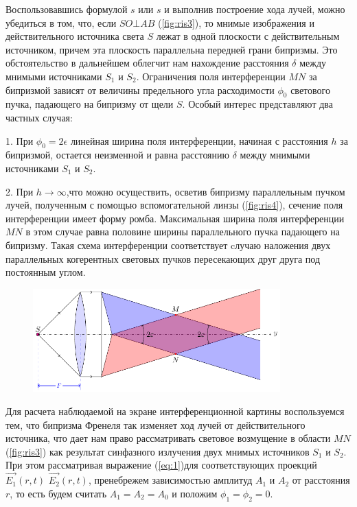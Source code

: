 Воспользовавшись формулой $s$ или $s$ и выполнив построение хода лучей, можно убедиться в том, что, если $SO\bot AB$ (\ref{fig:ris3}), то мнимые изображения и	действительного источника света $S$ лежат в одной плоскости с действительным источником, причем эта плоскость параллельна передней грани бипризмы. Это обстоятельство в дальнейшем облегчит нам нахождение расстояния $\delta$ между мнимыми источниками $S_1$ и	$S_2$.
Ограничения поля интерференции $MN$ за бипризмой зависят от величины предельного угла расходимости $\phi_0$ светового пучка, падающего на бипризму от щели $S$. Особый интерес представляют два частных случая:

1. При $\phi_0 = 2\epsilon$	линейная ширина поля интерференции,
начиная с расстояния $h$ за бипризмой, остается неизменной и равна расстоянию $\delta$ между мнимыми источниками $S_1$ и $S_2$.

2. При $h\rightarrow\infty$,что можно осуществить,
осветив бипризму параллельным пучком лучей, полученным с помощью вспомогательной линзы (\ref{fig:ris4}), сечение поля интерференции имеет форму ромба. Максимальная ширина поля интерференции $MN$ в этом случае равна половине ширины параллельного пучка падающего на бипризму. Такая схема интерференции соответствует cлучаю наложения двух параллельных когерентных световых пучков
пересекающих друг друга под постоянным углом.
\begin{figure}[H]
	\centering
	\includegraphics[width=0.85\textwidth]{ris/ris4}
	\caption{ }
	\label{fig:ris2}
\end{figure}
Для расчета наблюдаемой на экране интерференционной картины воспользуемся тем, что бипризма Френеля так изменяет ход лучей от действительного источника, что дает нам право рассматривать световое возмущение в области $MN$ (\ref{fig:ris3}) как результат синфазного излучения двух мнимых источников $S_1$ и $S_2$. При этом рассматривая выражение (\ref{eq:1})для соответствующих проекций $\vec{E_1}(r,t)$ $\vec{E_2}(r,t)$, пренебрежем зависимостью амплитуд $A_1$ и $A_2$ от расстояния $r$, то есть будем считать $A_1=A_2=A_0$	и положим $\phi_1=\phi_2=0$.

